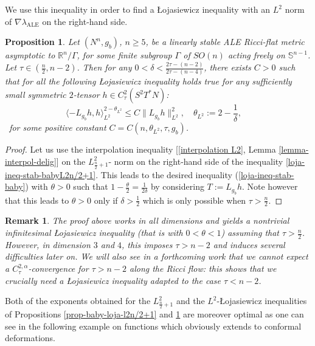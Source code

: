 \documentclass[a4paper,11pt,reqno]{amsart}
\newtheorem{prop}[defn]{Proposition}
\newtheorem{rk}[defn]{Remark}
\def\RR{\mathbb{R}}
\numberwithin{equation}{section}
\begin{document}
We use this inequality in order to find a \L{}ojasiewicz inequality  with an $L^2$ norm of $\nabla\lambda_{\operatorname{ALE}}$ on the right-hand side.
	\begin{prop}\label{prop-baby-loja} Let $(N^n,g_b)$, $n\geq 5$, be a linearly stable ALE Ricci-flat metric asymptotic to $\RR^n\slash\Gamma$, for some finite subgroup $\Gamma$ of $SO(n)$ acting freely on $\mathbb{S}^{n-1}$. Let $\tau\in\left(\frac{n}{2},n-2\right)$. Then for any $0<\delta<\frac{2\tau-(n-2)}{2\tau-(n-4)}$, there exists $C>0$ such that for all  the following \L{}ojasiewicz inequality holds true for any sufficiently small symmetric $2$-tensor $h\in C_{\tau}^{2}(S^2T^*N)$:
		\begin{equation}
		\langle-L_{g_b} h,h\rangle_{L^2}^{2-\theta_{L^2}}\leq C\|L_{g_b}h\|^2_{L^2},\quad\theta_{L^2}:=2-\frac{1}{\delta}, \quad \label{loja-ineq-stab-baby}
		\end{equation}\
		for some positive constant $C=C(n,\theta_{L^2},\tau,g_b)$.\\
	\end{prop}
\begin{proof}
	Let us use the interpolation inequality [\eqref{interpolation L2}, Lemma \ref{lemma-interpol-delig}] on the $L^2_{\frac{n}{2}+1}$- norm on the right-hand side of the inequality \eqref{loja-ineq-stab-babyL2n/2+1}. This leads to the desired inequality (\ref{loja-ineq-stab-baby}) with $\theta>0$ such that $1-\frac{\theta}{2} = \frac{1}{2\delta}$ by considering $T:= L_{g_b} h$. Note however that this leads to $\theta>0$ only if $\delta>\frac{1}{2}$ which is only possible when $\tau>\frac{n}{2}$.
\end{proof}

	
	
	\begin{rk}
		The proof above works in all dimensions and yields a nontrivial infinitesimal \L{}ojasiewicz inequality (that is with $0<\theta<1$) assuming that $\tau>\frac{n}{2}$. However, in dimension $3$ and $4$, this imposes $\tau>n-2$ and induces several difficulties later on. We will also see in a forthcoming work that we cannot expect a $C^{2,\alpha}_\tau$-convergence for $\tau>n-2$ along the Ricci flow: this shows that we crucially need a \L{}ojasiewicz inequality adapted to the case $\tau<n-2$.
	\end{rk}
	
	
Both of the exponents obtained for the $L^2_{\frac{n}{2}+1}$ and the $L^2$-\L{}ojasiewicz inequalities of Propositions \ref{prop-baby-loja-l2n/2+1}  and \ref{prop-baby-loja} are moreover optimal as one can see in the following example on functions which obviously extends to conformal deformations.
\end{document}

